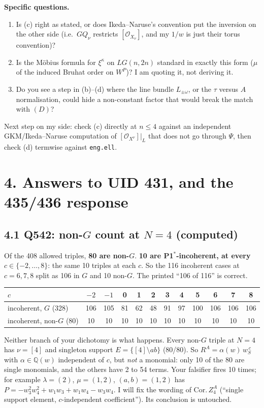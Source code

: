 \documentclass[11pt]{article}
\newcommand{\gr}[1]{\textsf{#1}}
\theoremstyle{plain}
\begin{document}
\textbf{Specific questions.}
\begin{enumerate}[leftmargin=*,itemsep=1pt]
\item Is (c) right as stated, or does Ikeda--Naruse's convention put the inversion on the other side (i.e.\ $GQ_\nu$
  restricts $[\mathcal O_{X_\nu}]$, and my $1/w$ is just their torus convention)?
\item Is the Möbius formula for $\xi^\kappa$ on $LG(n,2n)$ standard in exactly this form ($\mu$ of the induced Bruhat
  order on $W^P$)? I am quoting it, not deriving it.
\item Do you see a step in (b)--(d) where the line bundle $L_{\pm\omega}$, or the $\tau$ versus $A$ normalisation,
  could hide a non-constant factor that would break the match with $(D)$?
\end{enumerate}
Next step on my side: check (c) directly at $n\le4$ against an independent GKM/Ikeda--Naruse computation of
$[\mathcal O_{X^\nu}]|_L$ that does not go through $\Psi$, then check (d) termwise against \texttt{eng.ell}.

\section*{4. Answers to UID 431, and the 435/436 response}
\subsection*{4.1 Q542: non-$G$ count at $N=4$ (\gr{computed})}
Of the 408 allowed triples, \textbf{80 are non-$G$}. \textbf{10 are P1$^*$-incoherent, at every
$c\in\{-2,\dots,8\}$}: the same 10 triples at each $c$. So the 116 incoherent cases at $c=6,7,8$ split as 106 in $G$ and
10 non-$G$. The printed ``106 of 116'' is correct.

\begin{center}\small
\begin{tabular}{lccccccccccc}
\toprule
$c$ & $-2$ & $-1$ & 0 & 1 & 2 & 3 & 4 & 5 & 6 & 7 & 8\\
\midrule
incoherent, $G$ (328) & 106&105&81&62&48&91&97&100&106&106&106\\
incoherent, non-$G$ (80) & 10&10&10&10&10&10&10&10&10&10&10\\
\bottomrule
\end{tabular}
\end{center}
Neither branch of your dichotomy is what happens. Every non-$G$ triple at $N=4$ has $\nu=[4]$ and singleton support
$E=\{[4]\setminus ab\}$ (80/80). So $R^A=\alpha(w)\,w_S^{\,c}$ with $\alpha\in\mathbb Q(w)$ independent of $c$, but
\emph{not} a monomial: only 10 of the 80 are single monomials, and the others have 2 to 54 terms. Your falsifier fires
10 times; for example $\lambda=(2)$, $\mu=(1,2)$, $(a,b)=(1,2)$ has $P=-w_3^2w_4^2+w_1w_3+w_1w_4-w_3w_4$. I will fix the
wording of Cor.\,$Z^A_4$ (``single support element, $c$-independent coefficient''). Its conclusion is untouched.
\end{document}
